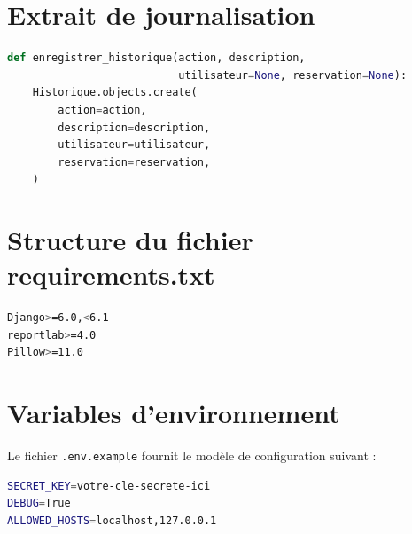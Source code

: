 \section{Extrait de journalisation}
\begin{lstlisting}[language=Python,caption={Fonction d'enregistrement dans l'historique}]
def enregistrer_historique(action, description, 
                           utilisateur=None, reservation=None):
    Historique.objects.create(
        action=action,
        description=description,
        utilisateur=utilisateur,
        reservation=reservation,
    )
\end{lstlisting}

\section{Structure du fichier requirements.txt}
\begin{lstlisting}[language=bash,caption={Dependances du projet}]
Django>=6.0,<6.1
reportlab>=4.0
Pillow>=11.0
\end{lstlisting}

\section{Variables d'environnement}
Le fichier \texttt{.env.example} fournit le modèle de configuration suivant :

\begin{lstlisting}[language=bash,caption={Modele de fichier .env.example}]
SECRET_KEY=votre-cle-secrete-ici
DEBUG=True
ALLOWED_HOSTS=localhost,127.0.0.1
\end{lstlisting}

\clearpage
